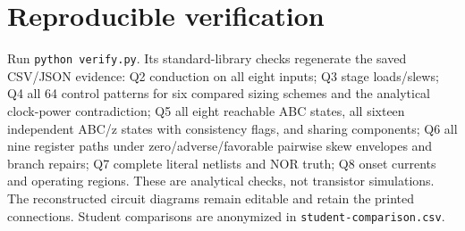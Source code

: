 \documentclass[10pt]{article}
\begin{document}
\section*{Reproducible verification}
Run \texttt{python verify.py}. Its standard-library checks regenerate the saved CSV/JSON evidence: Q2 conduction on all eight inputs; Q3 stage loads/slews; Q4 all 64 control patterns for six compared sizing schemes and the analytical clock-power contradiction; Q5 all eight reachable ABC states, all sixteen independent ABC/z states with consistency flags, and sharing components; Q6 all nine register paths under zero/adverse/favorable pairwise skew envelopes and branch repairs; Q7 complete literal netlists and NOR truth; Q8 onset currents and operating regions. These are analytical checks, not transistor simulations. The reconstructed circuit diagrams remain editable and retain the printed connections. Student comparisons are anonymized in \texttt{student-comparison.csv}.
\end{document}
